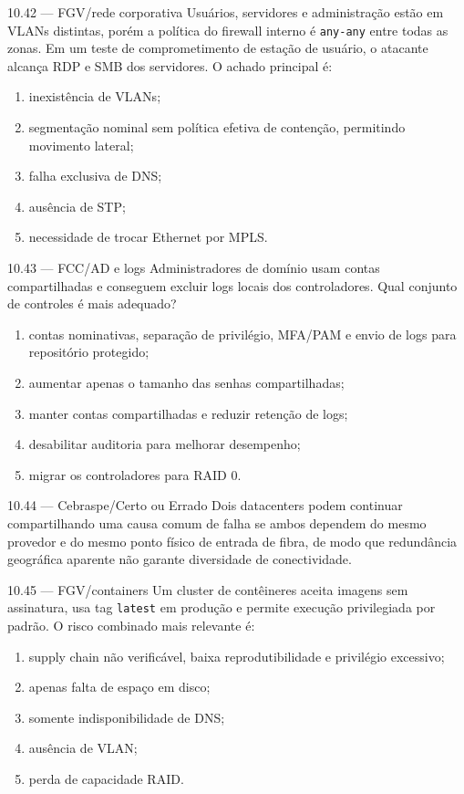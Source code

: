 \begin{questao}{ 10.42 — FGV/rede corporativa}
Usuários, servidores e administração estão em VLANs distintas, porém a política do firewall interno é \texttt{any-any} entre todas as zonas. Em um teste de comprometimento de estação de usuário, o atacante alcança RDP e SMB dos servidores. O achado principal é:
\begin{enumerate}[label=\Alph*)]
\item inexistência de VLANs;
\item segmentação nominal sem política efetiva de contenção, permitindo movimento lateral;
\item falha exclusiva de DNS;
\item ausência de STP;
\item necessidade de trocar Ethernet por MPLS.
\end{enumerate}
\end{questao}

\begin{questao}{ 10.43 — FCC/AD e logs}
Administradores de domínio usam contas compartilhadas e conseguem excluir logs locais dos controladores. Qual conjunto de controles é mais adequado?
\begin{enumerate}[label=\Alph*)]
\item contas nominativas, separação de privilégio, MFA/PAM e envio de logs para repositório protegido;
\item aumentar apenas o tamanho das senhas compartilhadas;
\item manter contas compartilhadas e reduzir retenção de logs;
\item desabilitar auditoria para melhorar desempenho;
\item migrar os controladores para RAID 0.
\end{enumerate}
\end{questao}

\begin{questao}{ 10.44 — Cebraspe/Certo ou Errado}
Dois datacenters podem continuar compartilhando uma causa comum de falha se ambos dependem do mesmo provedor e do mesmo ponto físico de entrada de fibra, de modo que redundância geográfica aparente não garante diversidade de conectividade.
\end{questao}

\begin{questao}{ 10.45 — FGV/containers}
Um cluster de contêineres aceita imagens sem assinatura, usa tag \texttt{latest} em produção e permite execução privilegiada por padrão. O risco combinado mais relevante é:
\begin{enumerate}[label=\Alph*)]
\item supply chain não verificável, baixa reprodutibilidade e privilégio excessivo;
\item apenas falta de espaço em disco;
\item somente indisponibilidade de DNS;
\item ausência de VLAN;
\item perda de capacidade RAID.
\end{enumerate}
\end{questao}

